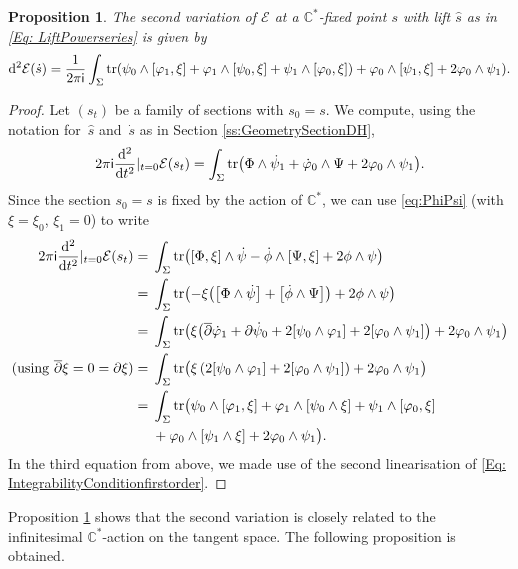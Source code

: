\documentclass[pdftex]{sigma}
\numberwithin{equation}{section}
\newtheorem{Proposition}[Theorem]{Proposition}
\theoremstyle{definition}
\newcommand\C{{\mathbb C}}
\renewcommand{\i}{\mathsf{i}}
\begin{document}
\begin{Proposition}\label{prop1}
The second variation of $\mathcal E$ at a $\C^*$-fixed point $s$ with lift $\widehat{s}$ as in \eqref{Eq: LiftPowerseries} is given by
\[
{\rm d}^2\mathcal{E}(\dot s)= \frac{1}{2\pi \i}\int_\Sigma\operatorname{tr}(\psi_0\wedge[\varphi_1,\xi] + \varphi_1\wedge[\psi_0,\xi] + \psi_1\wedge[\varphi_0,\xi]) +\varphi_0\wedge[\psi_1, \xi] + 2\varphi_0\wedge\psi_1) .
\]
\end{Proposition}
\begin{proof}
Let $(s_t)$ be a family of sections with $s_0 = s$. We compute, using the notation for~$\widehat{s}$ and~$\dot s$ as in Section \ref{ss:GeometrySectionDH},
\[
2\pi \i\frac{{\rm d}^2}{{\rm d}t^2}|_{t=0}\mathcal E(s_t) =
\int_\Sigma\operatorname{tr}\bigl(\Phi\wedge\dot\psi_1 + \dot\varphi_0\wedge\Psi + 2\varphi_0\wedge\psi_1\bigr).
\]
Since the section $s_0 = s$ is fixed by the action of $\C^*$, we can use \eqref{eq:PhiPsi} (with $\xi
= \xi_0$, $\xi_1 = 0$) to write
\begin{align*}
2\pi \i\frac{{\rm d}^2}{{\rm d}t^2}|_{t=0}\mathcal E(s_t) ={}&
\int_\Sigma\operatorname{tr}\bigl([\Phi,\xi]\wedge\dot\psi -\dot\phi\wedge[\Psi,\xi] + 2\phi\wedge\psi\bigr)\\
={}& \int_\Sigma\operatorname{tr}\bigl(-\xi\bigl(\big[\Phi\wedge\dot\psi\big] + \big[\dot\phi\wedge\Psi\big]\bigr) + 2\phi\wedge\psi\bigr)\\
={}& \int_\Sigma\operatorname{tr}\bigl(\xi\bigl(\overline{\partial}\dot\varphi_1 +
\partial\dot\psi_0 + 2[\psi_0\wedge\varphi_1] + 2[\varphi_0\wedge \psi_1]\bigr) + 2\varphi_0\wedge\psi_1\bigr)\\
({\rm using}~\overline{\partial}\xi = 0 = \partial\xi) ={}& \int_\Sigma\operatorname{tr}\bigl(\xi\left(2[\psi_0\wedge\varphi_1] + 2[\varphi_0\wedge \psi_1]\right) + 2\varphi_0\wedge\psi_1\bigr)\\
={}& \int_\Sigma\operatorname{tr}\bigl(\psi_0\wedge[\varphi_1,\xi] + \varphi_1\wedge[\psi_0\wedge\xi] + \psi_1\wedge[\varphi_0,\xi] \\
&+\varphi_0\wedge[\psi_1\wedge\xi] + 2\varphi_0\wedge\psi_1\bigr).
\end{align*}
In the third equation from above, we made use of the second linearisation of \eqref{Eq: IntegrabilityConditionfirstorder}.
\end{proof}

Proposition \ref{prop1} shows that
the second variation is closely related to the infinitesimal $\C^*$-action on the tangent space. The following proposition is obtained.
\end{document}
